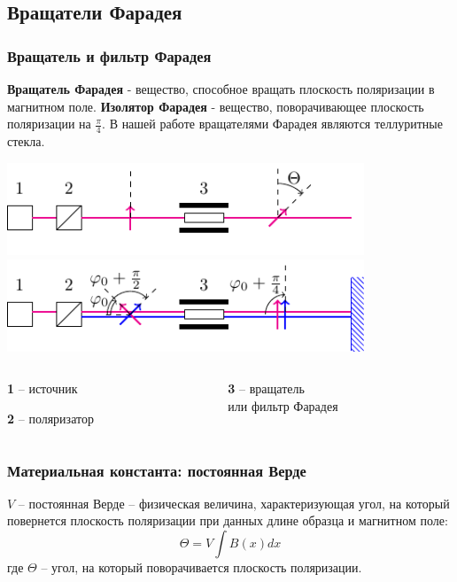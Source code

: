 \documentclass[10pt,pdf,hyperref={unicode}, dvipsnames]{beamer}
\begin{document}
\subsection{Вращатели Фарадея}
\begin{frame}[t]
	\frametitle{Вращатель и фильтр Фарадея}
	\textbf{Вращатель Фарадея} - вещество, способное вращать плоскость поляризации в магнитном поле. \textbf{Изолятор Фарадея} - вещество, поворачивающее плоскость поляризации на $\frac{\pi}{4}$. В нашей работе вращателями Фарадея являются теллуритные стекла. 
	\begin{center}
		\includegraphics[width=0.8\textwidth]{img/rot}
		\includegraphics[width=0.8\textwidth]{img/zerc}
	\end{center}
	\begin{columns}
		\hspace{2.5cm}
		\begin{column}{0.3\textwidth}
			
			\textbf{1} -- источник
			
			\textbf{2} -- поляризатор
			
		\end{column}
		\hspace{1.6cm}
		\begin{column}{0.7\textwidth}
			
			\textbf{3} -- вращатель\\
			или фильтр Фарадея
		\end{column}
	\end{columns}
	
	
	
\end{frame}
\begin{frame}
	\frametitle{Материальная константа: постоянная Верде}
	$V$ -- постоянная Верде -- физическая величина, характеризующая угол, на который повернется плоскость поляризации при данных длине образца и магнитном поле:
	\begin{equation}
		\Theta=V \int B(x)dx
	\end{equation}
	где $\Theta$ -- угол, на который поворачивается плоскость поляризации.
\end{frame}
\end{document}

